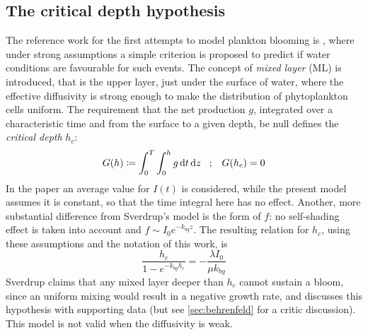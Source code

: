 
\subsection{The critical depth hypothesis} \label{sec:sverdrup}
The reference work for the first attempts to model plankton blooming is \autocite{Sverdrup1953OnPhytoplankton}, where under strong assumptions a simple criterion is proposed to predict if water conditions are favourable for such events. The concept of \textit{mixed layer} (ML) is introduced, that is the upper layer, just under the surface of water, where the effective diffusivity is strong enough to make the distribution of phytoplankton cells uniform. The requirement that the net production $g$, integrated over a characteristic time and from the surface to a given depth, be null defines the \textit{critical depth} $h_c$:
\[ G(h) \coloneqq \int_0^T \int_0^{h} g \,\mathrm{d}t\, \mathrm{d} z\;\;\; ; \;\;\;  G(h_c) = 0\]
In the paper an average value for $I(t)$ is considered, while the present model assumes it is constant, so that the time integral here has no effect. Another, more substantial difference from Sverdrup's model is the form of $f$: no self-shading effect is taken into account and \( f \sim I_0 e^{-k_{bg}z} \). The resulting relation for $h_c$, using these assumptions and the notation of this work, is
\[ \frac{h_c}{1-e^{-k_{bg} h_c}} = -\frac{\lambda I_0}{\mu k_{bg}} \] 
Sverdrup claims that any mixed layer deeper than $h_c$ cannot sustain a bloom, since an uniform mixing would result in a negative growth rate, and discusses this hypothesis with supporting data (but see \autoref{sec:behrenfeld} for a critic discussion). This model is not valid when the diffusivity is weak.

